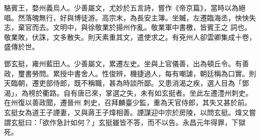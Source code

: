 \begin{pinyinscope}
 駱賓王，婺州義烏人。少善屬文，尤妙於五言詩，嘗作《帝京篇》，當時以為絕唱。然落魄無行，好與博徒游。高宗末，為長安主簿。坐贓，左遷臨海丞，怏怏失志，棄官而去。文明中，與徐敬業於揚州作亂。敬業軍中書檄，皆賓王之
 詞也。敬業敗，伏誅，文多散失。則天素重其文，遣使求之。有兗州人卻雲卿集成十卷，盛傳於世。



 鄧玄挺，雍州藍田人。少善屬文，累遷左史。坐與上官儀善，出為頓丘令。有善政，璽書勞問。累授中書舍人。性俊辨，機捷過人，每有嘲謔，朝廷稱為口實。則天臨朝，遷吏部侍郎，既不稱職，甚為時談所鄙。又患消渴之疾，選人目為「鄧渴」，為榜於衢路。自有唐已來，掌選之失，未有如玄挺者。坐此左遷澧州刺史。在州復以善政聞，遷晉州
 刺史，召拜麟臺少監，重為天官侍郎，其失又甚於前。玄挺女為道王子諲妻，又與蔣王子煒相善。諲謀迎中宗於房陵，以問玄挺。煒又嘗謂玄挺曰：「欲作急計如何？」玄挺雖皆不答，而不以告。永昌元年得罪，下獄死。



\end{pinyinscope}